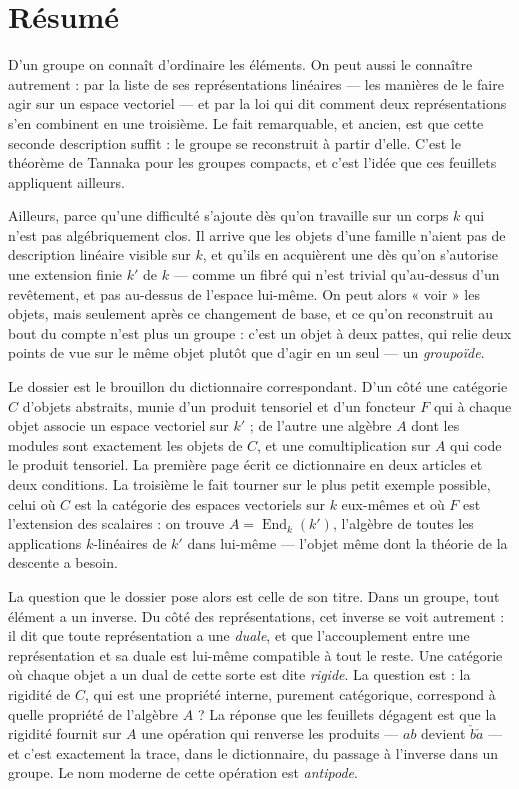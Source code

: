 \documentclass[11pt,a4paper]{article}
\begin{document}
\section*{Résumé}

\begin{resume}
D'un groupe on connaît d'ordinaire les éléments. On peut aussi le connaître
autrement : par la liste de ses représentations linéaires — les manières de le
faire agir sur un espace vectoriel — et par la loi qui dit comment deux
représentations s'en combinent en une troisième. Le fait remarquable, et
ancien, est que cette seconde description suffit : le groupe se reconstruit à
partir d'elle. C'est le théorème de Tannaka pour les groupes compacts, et c'est
l'idée que ces feuillets appliquent ailleurs.

Ailleurs, parce qu'une difficulté s'ajoute dès qu'on travaille sur un corps
$k$ qui n'est pas algébriquement clos. Il arrive que les objets d'une famille
n'aient pas de description linéaire visible sur $k$, et qu'ils en acquièrent
une dès qu'on s'autorise une extension finie $k'$ de $k$ — comme un fibré qui
n'est trivial qu'au-dessus d'un revêtement, et pas au-dessus de l'espace
lui-même. On peut alors « voir » les objets, mais seulement après ce
changement de base, et ce qu'on reconstruit au bout du compte n'est plus un
groupe : c'est un objet à deux pattes, qui relie deux points de vue sur le
même objet plutôt que d'agir en un seul — un \emph{groupoïde}.

Le dossier est le brouillon du dictionnaire correspondant. D'un côté une
catégorie $C$ d'objets abstraits, munie d'un produit tensoriel et d'un
foncteur $F$ qui à chaque objet associe un espace vectoriel sur $k'$ ; de
l'autre une algèbre $A$ dont les modules sont exactement les objets de $C$, et
une comultiplication sur $A$ qui code le produit tensoriel. La première page
écrit ce dictionnaire en deux articles et deux conditions. La troisième le fait
tourner sur le plus petit exemple possible, celui où $C$ est la catégorie des
espaces vectoriels sur $k$ eux-mêmes et où $F$ est l'extension des scalaires :
on trouve $A = \operatorname{End}_{k}(k')$, l'algèbre de toutes les
applications $k$-linéaires de $k'$ dans lui-même — l'objet même dont la théorie
de la descente a besoin.

La question que le dossier pose alors est celle de son titre. Dans un groupe,
tout élément a un inverse. Du côté des représentations, cet inverse se voit
autrement : il dit que toute représentation a une \emph{duale}, et que
l'accouplement entre une représentation et sa duale est lui-même compatible à
tout le reste. Une catégorie où chaque objet a un dual de cette sorte est dite
\emph{rigide}. La question est : la rigidité de $C$, qui est une propriété
interne, purement catégorique, correspond à quelle propriété de l'algèbre $A$ ?
La réponse que les feuillets dégagent est que la rigidité fournit sur $A$ une
opération qui renverse les produits — $ab$ devient $\check{b}\check{a}$ — et
c'est exactement la trace, dans le dictionnaire, du passage à l'inverse dans un
groupe. Le nom moderne de cette opération est \emph{antipode}.


\end{resume}
\end{document}

